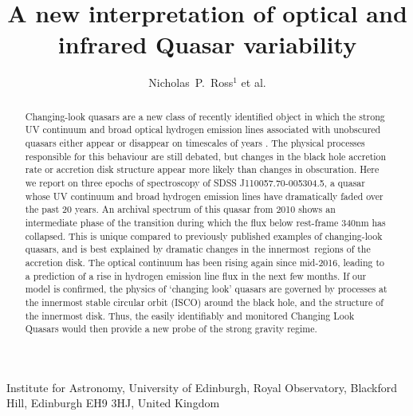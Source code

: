 \documentclass{nature}
\title{A new interpretation of optical and infrared Quasar variability}
\author{Nicholas~P.~Ross$^{1}$ et al.}
\begin{document}
\maketitle

\begin{affiliations}
  \item Institute for Astronomy, University of Edinburgh, Royal Observatory, Blackford Hill, Edinburgh EH9 3HJ, United Kingdom 
\end{affiliations}


\begin{abstract}
Changing-look quasars are a new class of recently identified object in
which the strong UV continuum and broad optical hydrogen emission
lines associated with unobscured quasars either appear or disappear on
timescales of years \cite{LaMassa15, Runnoe16, MacLeod16, Ruan16}. The
physical processes responsible for this behaviour are still debated,
but changes in the black hole accretion rate or accretion disk
structure appear more likely than changes in
obscuration\cite{Hutsemekers17, Sheng17}. Here we report on three
epochs of spectroscopy of SDSS J110057.70-005304.5, a quasar whose UV
continuum and broad hydrogen emission lines have dramatically faded
over the past 20 years. An archival spectrum of this quasar from 2010
shows an intermediate phase of the transition during which the flux
below rest-frame 340nm has collapsed. This is unique compared to
previously published examples of changing-look quasars, and is best
explained by dramatic changes in the innermost regions of the
accretion disk. The optical continuum has been rising again since
mid-2016, leading to a prediction of a rise in hydrogen emission line
flux in the next few months. If our model is confirmed, the physics of
`changing look' quasars are governed by processes at the innermost
stable circular orbit (ISCO) around the black hole, and the structure
of the innermost disk. Thus, the easily identifiably and monitored
Changing Look Quasars would then provide a new probe of the strong
gravity regime.
\end{abstract}
\end{document}
